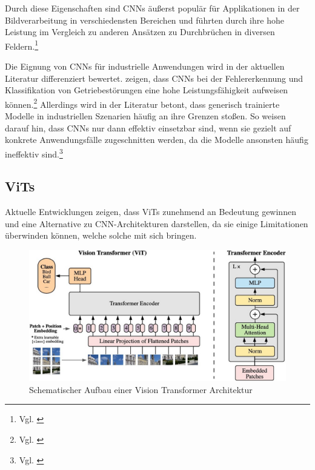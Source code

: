 Durch diese Eigenschaften sind \acp{CNN} äußerst populär für Applikationen in der Bildverarbeitung in verschiedensten Bereichen und führten durch ihre hohe Leistung im Vergleich zu anderen Ansätzen zu Durchbrüchen in diversen Feldern.\footnote{Vgl. \cite[S. 4762 ff.]{singh_convolutional_2021}}

Die Eignung von \acp{CNN} für industrielle Anwendungen wird in der aktuellen Literatur differenziert bewertet. \cite{jing_convolutional_2017} zeigen, dass \acp{CNN} bei der Fehlererkennung und Klassifikation von Getriebestörungen eine hohe Leistungsfähigkeit aufweisen können.\footnote{Vgl. \cite{jing_convolutional_2017}} 
Allerdings wird in der Literatur betont, dass generisch trainierte Modelle in industriellen Szenarien häufig an ihre Grenzen stoßen. So weisen \cite{khanam_comprehensive_2024} darauf hin, dass \acp{CNN} nur dann effektiv einsetzbar sind, wenn sie gezielt auf konkrete Anwendungsfälle zugeschnitten werden, da die Modelle ansonsten häufig ineffektiv sind.\footnote{Vgl. \cite[S. 9425]{khanam_comprehensive_2024}}

\subsection[Vision Transformer (ViTs)]{\acp{ViT}}
Aktuelle Entwicklungen zeigen, dass \acfp{ViT} zunehmend an Bedeutung gewinnen und eine Alternative zu \ac{CNN}-Architekturen darstellen, da sie einige Limitationen überwinden können, welche solche mit sich bringen. 

\begin{figure}[htb]
      \centering                        
      \includegraphics[width=0.9\linewidth]{graphics/ViT-architecture.jpg}
      \caption[Schematischer Aufbau einer Vision Transformer Architektur]{Schematischer Aufbau einer Vision Transformer Architektur\footnotemark }
      \label{fig:vit}
\end{figure}


